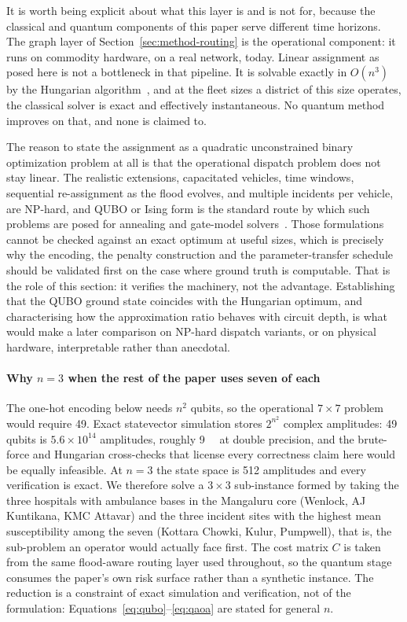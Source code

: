 \documentclass[10pt,twocolumn]{article}
\begin{document}
It is worth being explicit about what this layer is and is not for, because the
classical and quantum components of this paper serve different time horizons. The
graph layer of Section~\ref{sec:method-routing} is the operational component: it
runs on commodity hardware, on a real network, today. Linear assignment as posed
here is not a bottleneck in that pipeline. It is solvable exactly in $O(n^3)$ by
the Hungarian algorithm~\citep{kuhn1955}, and at the fleet sizes a district of
this size operates, the classical solver is exact and effectively instantaneous.
No quantum method improves on that, and none is claimed to.

The reason to state the assignment as a quadratic unconstrained binary
optimization problem at all is that the operational dispatch problem does not stay
linear. The realistic extensions, capacitated vehicles, time windows, sequential
re-assignment as the flood evolves, and multiple incidents per vehicle, are
NP-hard, and QUBO or Ising form is the standard route by which such problems are
posed for annealing and gate-model
solvers~\citep{lucas2014,glover2019,fitzek2024}. Those formulations cannot be
checked against an exact optimum at useful sizes, which is precisely why the
encoding, the penalty construction and the parameter-transfer schedule should be
validated first on the case where ground truth is computable. That is the role of
this section: it verifies the machinery, not the advantage. Establishing that the
QUBO ground state coincides with the Hungarian optimum, and characterising how
the approximation ratio behaves with circuit depth, is what would make a later
comparison on NP-hard dispatch variants, or on physical hardware, interpretable
rather than anecdotal.

\paragraph{Why $n=3$ when the rest of the paper uses seven of each}
The one-hot encoding below needs $n^2$ qubits, so the operational $7\times7$
problem would require 49. Exact statevector simulation stores $2^{n^2}$ complex
amplitudes: 49 qubits is $5.6\times10^{14}$ amplitudes, roughly \SI{9}{\peta\byte}
at double precision, and the brute-force and Hungarian cross-checks that license
every correctness claim here would be equally infeasible. At $n=3$ the state
space is 512 amplitudes and every verification is exact. We therefore solve a
$3\times3$ sub-instance formed by taking the three hospitals with ambulance
bases in the Mangaluru core (Wenlock, AJ Kuntikana, KMC Attavar) and the three
incident sites with the highest mean susceptibility among the seven (Kottara
Chowki, Kulur, Pumpwell), that is, the sub-problem an operator would actually
face first. The cost matrix $C$ is taken from the same flood-aware routing layer
used throughout, so the quantum stage consumes the paper's own risk surface
rather than a synthetic instance. The reduction is a constraint of exact
simulation and verification, not of the formulation:
Equations~\eqref{eq:qubo}--\eqref{eq:qaoa} are stated for general $n$.
\end{document}
